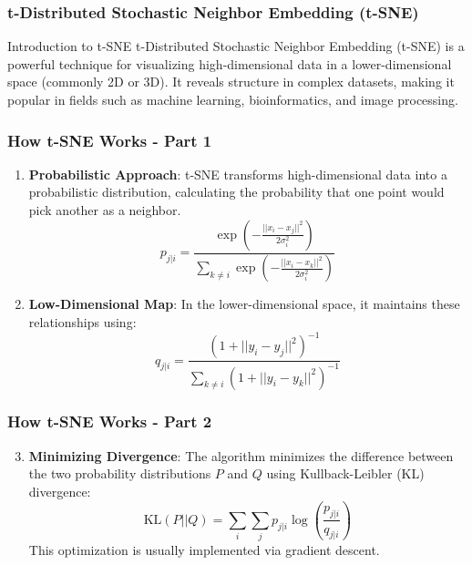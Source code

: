 \documentclass[aspectratio=169]{beamer}
\begin{document}
\begin{frame}[fragile]
    \frametitle{t-Distributed Stochastic Neighbor Embedding (t-SNE)}
    \begin{block}{Introduction to t-SNE}
        t-Distributed Stochastic Neighbor Embedding (t-SNE) is a powerful technique for visualizing high-dimensional data in a lower-dimensional space (commonly 2D or 3D).
        It reveals structure in complex datasets, making it popular in fields such as machine learning, bioinformatics, and image processing.
    \end{block}
\end{frame}

\begin{frame}[fragile]
    \frametitle{How t-SNE Works - Part 1}
    \begin{enumerate}
        \item \textbf{Probabilistic Approach}:
        t-SNE transforms high-dimensional data into a probabilistic distribution, calculating the probability that one point would pick another as a neighbor.
        \begin{equation}
        p_{j|i} = \frac{\exp\left(- \frac{||x_i - x_j||^2}{2\sigma_i^2}\right)}{\sum_{k \neq i} \exp\left(- \frac{||x_i - x_k||^2}{2\sigma_i^2}\right)}
        \end{equation}
        \item \textbf{Low-Dimensional Map}:
        In the lower-dimensional space, it maintains these relationships using:
        \begin{equation}
        q_{j|i} = \frac{(1 + ||y_i - y_j||^2)^{-1}}{\sum_{k \neq i} (1 + ||y_i - y_k||^2)^{-1}}
        \end{equation}
    \end{enumerate}
\end{frame}

\begin{frame}[fragile]
    \frametitle{How t-SNE Works - Part 2}
    \begin{enumerate}
        \setcounter{enumi}{2}
        \item \textbf{Minimizing Divergence}:
        The algorithm minimizes the difference between the two probability distributions \( P \) and \( Q \) using Kullback-Leibler (KL) divergence:
        \begin{equation}
        \text{KL}(P || Q) = \sum_{i} \sum_{j} p_{j|i} \log\left(\frac{p_{j|i}}{q_{j|i}}\right)
        \end{equation}
        This optimization is usually implemented via gradient descent.
    \end{enumerate}
\end{frame}
\end{document}

